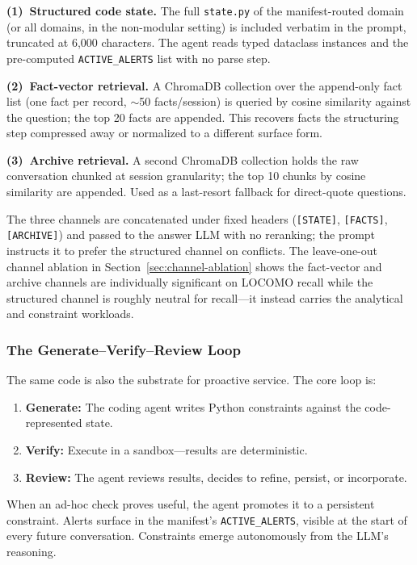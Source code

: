 \textbf{(1)~Structured code state.} The full \texttt{state.py} of the manifest-routed domain (or all domains, in the non-modular setting) is included verbatim in the prompt, truncated at 6{,}000 characters. The agent reads typed dataclass instances and the pre-computed \texttt{ACTIVE\_ALERTS} list with no parse step.

\textbf{(2)~Fact-vector retrieval.} A ChromaDB collection over the append-only fact list (one fact per record, $\sim$50 facts/session) is queried by cosine similarity against the question; the top 20 facts are appended. This recovers facts the structuring step compressed away or normalized to a different surface form.

\textbf{(3)~Archive retrieval.} A second ChromaDB collection holds the raw conversation chunked at session granularity; the top 10 chunks by cosine similarity are appended. Used as a last-resort fallback for direct-quote questions.

The three channels are concatenated under fixed headers (\texttt{[STATE]}, \texttt{[FACTS]}, \texttt{[ARCHIVE]}) and passed to the answer LLM with no reranking; the prompt instructs it to prefer the structured channel on conflicts. The leave-one-out channel ablation in Section~\ref{sec:channel-ablation} shows the fact-vector and archive channels are individually significant on LOCOMO recall while the structured channel is roughly neutral for recall---it instead carries the analytical and constraint workloads.

\subsubsection{The Generate--Verify--Review Loop}
\label{sec:gvr}

The same code is also the substrate for proactive service. The core loop is:
\begin{enumerate}[leftmargin=*]
\item \textbf{Generate:} The coding agent writes Python constraints against the code-represented state.
\item \textbf{Verify:} Execute in a sandbox---results are deterministic.
\item \textbf{Review:} The agent reviews results, decides to refine, persist, or incorporate.
\end{enumerate}

When an ad-hoc check proves useful, the agent promotes it to a persistent constraint. Alerts surface in the manifest's \texttt{ACTIVE\_ALERTS}, visible at the start of every future conversation. Constraints emerge autonomously from the LLM's reasoning.

